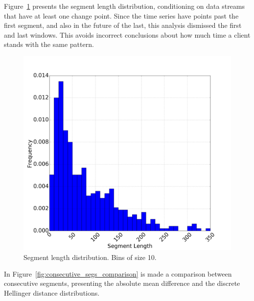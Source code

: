 Figure~\ref{fig:segs_length} presents the segment length distribution, conditioning on data streams that have at least one change point. Since the time series have points past the first segment, and also in the future of the last, this analysis dismissed the first and last windows. This avoids incorrect conclusions about how much time a client stands with the same pattern.

\begin{figure}[H]
    \centering
    \includegraphics[width=0.6\linewidth]{./figures/dataset/cp/middle_segment_length.png}
    \caption{Segment length distribution. Bins of size 10.}
    \label{fig:segs_length}
\end{figure}%

In Figure~\ref{fig:consecutive_segs_comparison} is made a comparison between consecutive segments, presenting the absolute mean difference and the discrete Hellinger distance distributions.

